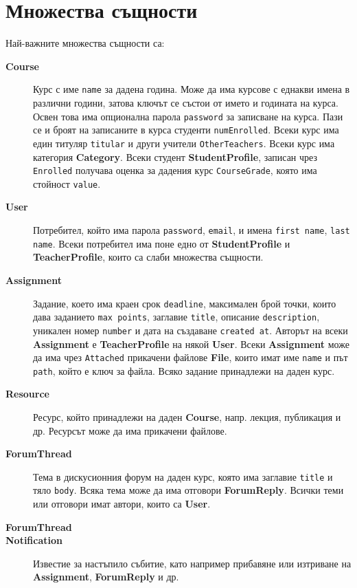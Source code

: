 \documentclass[a4paper,10pt, leqno]{article}
\newcommand{\attr}[1] {\texttt{#1}}
\newcommand{\enti}[1] {\textbf{#1}}
\newcommand{\re}[1] {\texttt{#1}}
\begin{document}
	\section{Множества същности}
	Най-важните множества същности са:
	\begin{description}
	    \item[\enti{Course}]
	      Курс с име \attr{name} за дадена година. Може да има курсове с еднакви имена в различни години, затова ключът се състои
	      от името и годината на курса. Освен това има опционална парола \attr{password} за записване на курса. Пази се и броят на записаните
	      в курса студенти \attr{numEnrolled}. Всеки курс има един титуляр \attr{titular} и други учители \re{OtherTeachers}.
	      Всеки курс има категория \enti{Category}.
	      Всеки студент \enti{StudentProfile}, записан чрез \re{Enrolled} получава оценка за дадения курс \re{CourseGrade}, която има стойност
	      \attr{value}.
	    \item[\enti{User}]
	      Потребител, който има парола \attr{password}, \attr{email}, и имена \attr{first name}, \attr{last name}.
	      Всеки потребител има поне едно от \enti{StudentProfile} и \\
	      \enti{TeacherProfile}, които са слаби множества същности.
	    \item[\enti{Assignment}]
	      Задание, което има краен срок \attr{deadline}, максимален брой точки, които дава заданието \attr{max points}, заглавие \attr{title},
	      описание \attr{description}, уникален номер \attr{number} и дата на създаване \attr{created at}. Авторът на всеки \enti{Assignment}
	      е \enti{TeacherProfile} на някой \enti{User}. Всеки \enti{Assignment} може да има чрез \re{Attached} прикачени файлове \enti{File},
	      които имат име \attr{name}
	      и път \attr{path}, който е ключ за файла. Всяко задание принадлежи на даден курс.
	    \item[\enti{Resource}]
	      Ресурс, който принадлежи на даден \enti{Course}, напр. лекция, публикация и др. 
	      Ресурсът може да има прикачени файлове.
	    \item[\enti{ForumThread}]
	      Тема в дискусионния форум на даден курс, която има заглавие \attr{title} и тяло \attr{body}. Всяка тема може да има
	      отговори \enti{ForumReply}. Всички теми или отговори имат автори, които са \enti{User}.
	    \item[\enti{ForumThread}]
	    \item[\enti{Notification}]
	      Известие за настъпило събитие, като например прибавяне или изтриване на \enti{Assignment}, \enti{ForumReply} и др.
	\end{description}
\end{document}

